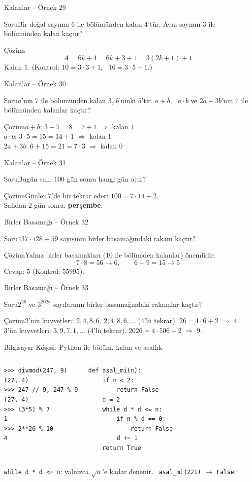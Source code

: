 \documentclass[aspectratio=169,11pt]{beamer}
\newcommand{\soru}[3]{%
\begin{frame}{#1}
  \begin{block}{Soru}\large #2\end{block}
  \pause
  \begin{exampleblock}{Çözüm}\large #3\end{exampleblock}
\end{frame}}
\begin{document}
\soru{Kalanlar -- Örnek 29}
{Bir doğal sayının \(6\) ile bölümünden kalan \(4\)'tür. Aynı sayının \(3\) ile bölümünden kalan kaçtır?}
{\[A=6k+4=6k+3+1=3(2k+1)+1\]
Kalan \(1\). \quad (Kontrol: \(10=3\cdot 3+1\), \ \(16=3\cdot 5+1\).)}

\soru{Kalanlar -- Örnek 30}
{\(a\)'nın \(7\) ile bölümünden kalan \(3\), \(b\)'ninki \(5\)'tir. \(a+b\), \ \(a\cdot b\) ve \(2a+3b\)'nin \(7\) ile bölümünden kalanlar kaçtır?}
{\(a+b\): \(3+5=8=7+1\) \(\Rightarrow\) kalan \(1\)\\[2pt]
\(a\cdot b\): \(3\cdot 5=15=14+1\) \(\Rightarrow\) kalan \(1\)\\[2pt]
\(2a+3b\): \(6+15=21=7\cdot 3\) \(\Rightarrow\) kalan \(0\)}

\soru{Kalanlar -- Örnek 31}
{Bugün salı. \(100\) gün sonra hangi gün olur?}
{Günler \(7\)'de bir tekrar eder: \(100=7\cdot 14+2\).\\[3pt]
Salıdan \(2\) gün sonra: \textbf{perşembe}.}

\soru{Birler Basamağı -- Örnek 32}
{\(437\cdot 128+59\) sayısının birler basamağındaki rakam kaçtır?}
{Yalnız birler basamakları (\(10\) ile bölümden kalanlar) önemlidir:
\[7\cdot 8=56\to 6,\qquad 6+9=15\to 5\]
Cevap: \(5\) \quad (Kontrol: \(55995\)).}

\soru{Birler Basamağı -- Örnek 33}
{\(2^{26}\) ve \(3^{2026}\) sayılarının birler basamağındaki rakamlar kaçtır?}
{\(2\)'nin kuvvetleri: \(2,4,8,6,\ 2,4,8,6,\dots\) (\(4\)'lü tekrar). \(26=4\cdot 6+2\) \(\Rightarrow\) \(4\).\\[3pt]
\(3\)'ün kuvvetleri: \(3,9,7,1,\dots\) (\(4\)'lü tekrar). \(2026=4\cdot 506+2\) \(\Rightarrow\) \(9\).}

\begin{frame}[fragile]{Bilgisayar Köşesi: Python ile bölüm, kalan ve asallık}
\begin{columns}[t]
\begin{verbatim}
>>> divmod(247, 9)
(27, 4)
>>> 247 // 9, 247 % 9
(27, 4)
>>> (3*5) % 7
1
>>> 2**26 % 10
4
\end{verbatim}
\begin{verbatim}
def asal_mi(n):
    if n < 2:
        return False
    d = 2
    while d * d <= n:
        if n % d == 0:
            return False
        d += 1
    return True
\end{verbatim}
\end{columns}
\small \verb|while d * d <= n|: yalnızca \(\sqrt{n}\)'e kadar denenir. \ \verb|asal_mi(221)| \(\to\) \verb|False|.
\end{frame}
\end{document}
